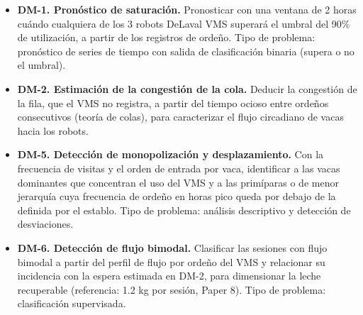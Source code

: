 \documentclass[11pt,letterpaper,DIV=12]{scrartcl}
\begin{document}
\begin{itemize}
  \item \textbf{DM-1. Pronóstico de saturación.} Pronosticar con una ventana de 2 horas cuándo cualquiera de los 3 robots DeLaval VMS superará el umbral del 90\% de utilización, a partir de los registros de ordeño. Tipo de problema: pronóstico de series de tiempo con salida de clasificación binaria (supera o no el umbral).
  \item \textbf{DM-2. Estimación de la congestión de la cola.} Deducir la congestión de la fila, que el VMS no registra, a partir del tiempo ocioso entre ordeños consecutivos (teoría de colas), para caracterizar el flujo circadiano de vacas hacia los robots.
  \item \textbf{DM-5. Detección de monopolización y desplazamiento.} Con la frecuencia de visitas y el orden de entrada por vaca, identificar a las vacas dominantes que concentran el uso del VMS y a las primíparas o de menor jerarquía cuya frecuencia de ordeño en horas pico queda por debajo de la definida por el establo. Tipo de problema: análisis descriptivo y detección de desviaciones.
  \item \textbf{DM-6. Detección de flujo bimodal.} Clasificar las sesiones con flujo bimodal a partir del perfil de flujo por ordeño del VMS y relacionar su incidencia con la espera estimada en DM-2, para dimensionar la leche recuperable (referencia: 1.2 kg por sesión, Paper 8). Tipo de problema: clasificación supervisada.
\end{itemize}

\printbibliography
\end{document}

